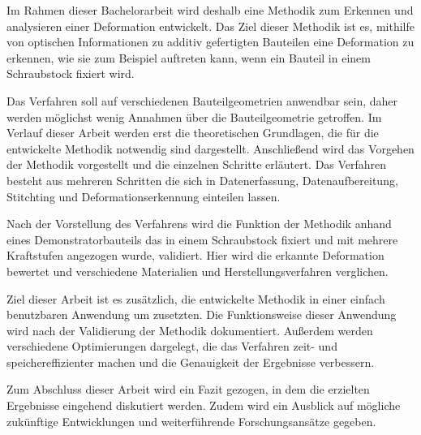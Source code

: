 Im Rahmen dieser Bachelorarbeit wird deshalb eine Methodik zum Erkennen und 
analysieren einer Deformation entwickelt. Das Ziel dieser Methodik ist es, 
mithilfe von optischen Informationen zu additiv gefertigten Bauteilen eine 
Deformation zu erkennen, wie sie zum Beispiel auftreten kann, wenn ein Bauteil 
in einem Schraubstock fixiert wird.

Das Verfahren soll auf verschiedenen Bauteilgeometrien anwendbar sein, daher werden 
möglichst wenig Annahmen über die Bauteilgeometrie getroffen.
Im Verlauf dieser Arbeit werden erst die theoretischen Grundlagen, die für die 
entwickelte Methodik notwendig sind dargestellt. 
Anschließend wird das Vorgehen der Methodik vorgestellt und die einzelnen 
Schritte erläutert. Das Verfahren besteht aus mehreren Schritten die sich in 
Datenerfassung, Datenaufbereitung, Stitchting und Deformationserkennung 
einteilen lassen.

Nach der Vorstellung des Verfahrens wird die Funktion der Methodik anhand eines 
Demonstratorbauteils das in einem Schraubstock fixiert und mit mehrere Kraftstufen 
angezogen wurde, validiert. Hier wird die erkannte Deformation bewertet und 
verschiedene Materialien und Herstellungsverfahren verglichen.

Ziel dieser Arbeit ist es zusätzlich, die entwickelte Methodik in einer einfach
benutzbaren Anwendung um zusetzten. Die Funktionsweise dieser Anwendung wird 
nach der Validierung der Methodik dokumentiert. Außerdem werden verschiedene 
Optimierungen dargelegt, die das Verfahren zeit- und speichereffizienter machen
und die Genauigkeit der Ergebnisse verbessern.

Zum Abschluss dieser Arbeit wird ein Fazit gezogen, in dem die erzielten 
Ergebnisse eingehend diskutiert werden. Zudem wird ein Ausblick auf 
mögliche zukünftige Entwicklungen und weiterführende Forschungsansätze gegeben.



